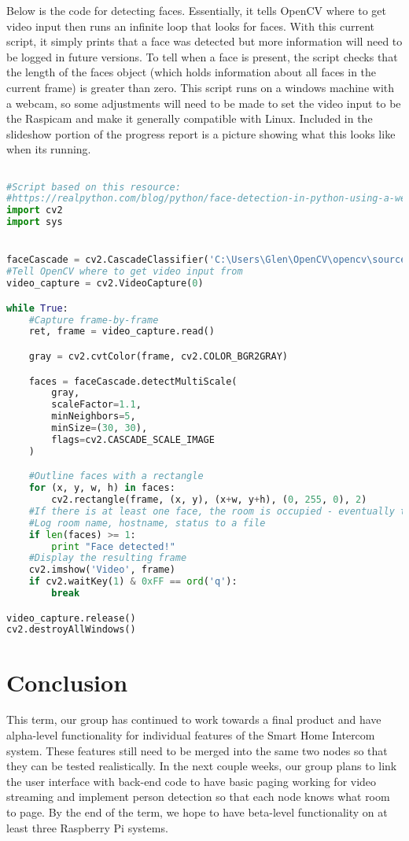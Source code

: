 \documentclass[onecolumn, draftclsnofoot,10pt, compsoc]{IEEEtran}
\begin{document}
Below is the code for detecting faces. Essentially, it tells OpenCV where to get video input then runs an infinite loop that looks for faces. With this current script, it simply prints that a face was detected but more information will need to be logged in future versions. To tell when a face is present, the script checks that the length of the faces object (which holds information about all faces in the current frame) is greater than zero. This script runs on a windows machine with a webcam, so some adjustments will need to be made to set the video input to be the Raspicam and make it generally compatible with Linux. Included in the slideshow portion of the progress report is a picture showing what this looks like when its running.
\begin{lstlisting}[language=Python]

#Script based on this resource: 
#https://realpython.com/blog/python/face-detection-in-python-using-a-webcam/
import cv2
import sys


faceCascade = cv2.CascadeClassifier('C:\Users\Glen\OpenCV\opencv\sources\data\haarcascades\haarcascade_frontalface_default.xml')
#Tell OpenCV where to get video input from 
video_capture = cv2.VideoCapture(0)

while True:
    #Capture frame-by-frame
    ret, frame = video_capture.read()

    gray = cv2.cvtColor(frame, cv2.COLOR_BGR2GRAY)

    faces = faceCascade.detectMultiScale(
        gray,
        scaleFactor=1.1,
        minNeighbors=5,
        minSize=(30, 30),
        flags=cv2.CASCADE_SCALE_IMAGE
    )

    #Outline faces with a rectangle 
    for (x, y, w, h) in faces:
        cv2.rectangle(frame, (x, y), (x+w, y+h), (0, 255, 0), 2)
    #If there is at least one face, the room is occupied - eventually this needs to be logged to a file with the node's information 
    #Log room name, hostname, status to a file 
    if len(faces) >= 1:
        print "Face detected!"
    #Display the resulting frame
    cv2.imshow('Video', frame)
    if cv2.waitKey(1) & 0xFF == ord('q'):
        break

video_capture.release()
cv2.destroyAllWindows()

\end{lstlisting}

\section{Conclusion}
This term, our group has continued to work towards a final product and have alpha-level functionality for individual features of the Smart Home Intercom system. These features still need to be merged into the same two nodes so that they can be tested realistically. In the next couple weeks, our group plans to link the user interface with back-end code to have basic paging working for video streaming and implement person detection so that each node knows what room to page. By the end of the term, we hope to have beta-level functionality on at least three Raspberry Pi systems. 
\end{document}
